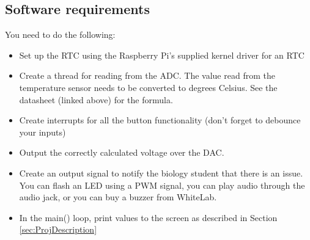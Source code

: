 \subsection{Software requirements}
You need to do the following:
\begin{itemize}
    \item Set up the RTC using the Raspberry Pi's supplied kernel driver for an RTC
    \item Create a thread for reading from the ADC. The value read from the temperature sensor needs to be converted to degrees Celsius. See the datasheet (linked above) for the formula.
    \item Create interrupts for all the button functionality (don't forget to debounce your inputs)
    \item Output the correctly calculated voltage over the DAC.
    \item Create an output signal to notify the biology student that there is an issue. You can flash an LED using a PWM signal, you can play audio through the audio jack, or you can buy a buzzer from WhiteLab. 
    \item In the main() loop, print values to the screen as described in Section \ref{sec:ProjDescription}
\end{itemize}

